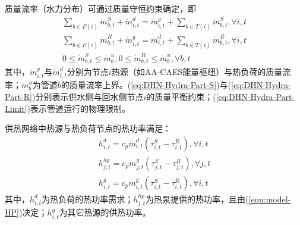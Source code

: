 质量流率（水力分布）可通过质量守恒约束确定\cite{LXZ-DHN-2016, DHN-Model-17}，即
\begin{subequations}
\label{eq:DHN-Hydra-Part}
\begin{gather}
\sum\limits_{b \in F(i)} {\dot m_{b,t}^S}  + \dot m_{i,t}^d = \dot m_{i,t}^g + \sum\limits_{b \in T(i)} {\dot m_{b,t}^S} ,\forall i,t \label{eq:DHN-Hydra-Part-S}\\
\sum\limits_{b \in F(i)} {\dot m_{b,t}^R}  + \dot m_{i,t}^g = \dot m_{i,t}^d + \sum\limits_{b \in T(i)} {\dot m_{b,t}^R} ,\forall i,t \label{eq:DHN-Hydra-Part-R}\\
0 \le \dot m_{b,t}^S \le \dot m_b^u,0 \le \dot m_{b,t}^R \le \dot m_b^u,\forall b,t\label{eq:DHN-Hydra-Part-Limit}
\end{gather}
\end{subequations}
其中，$\dot m_{i,t}^g$与$\dot m_{i,t}^d$分别为节点$i$热源（如AA-CAES能量枢纽）与热负荷的质量流率；$\dot m_b^u$为管道$b$的质量流率上界。(\ref{eq:DHN-Hydra-Part-S})与(\ref{eq:DHN-Hydra-Part-R})分别表示供水侧与回水侧节点$i$的质量平衡约束；(\ref{eq:DHN-Hydra-Part-Limit})表示管道运行的物理限制。

供热网络中热源与热负荷节点的热功率满足：
\begin{subequations}
\label{eq:DHN-heat-power-model}
\begin{gather}
h_{i,t}^{d} = c_p \dot m_{i,t}^d  (\tau_{i,t}^S - \tau_{i,t}^R), \forall i,t \\
h_{j,t}^{hp} = c_p \dot m_{j,t}^g  (\tau_{j,t}^S - \tau_{j,t}^R), \forall j,t \\
h_{i,t}^{g} = c_p \dot m_{i,t}^g  (\tau_{i,t}^S - \tau_{i,t}^R), \forall i,t
\end{gather}
\end{subequations}
其中，$h_{i,t}^d$为热负荷的热功率需求；$h_{j,t}^{hp}$为热泵提供的热功率，且由(\ref{equ:model-HP})决定；$h_{i,t}^g$为其它热源的供热功率。

